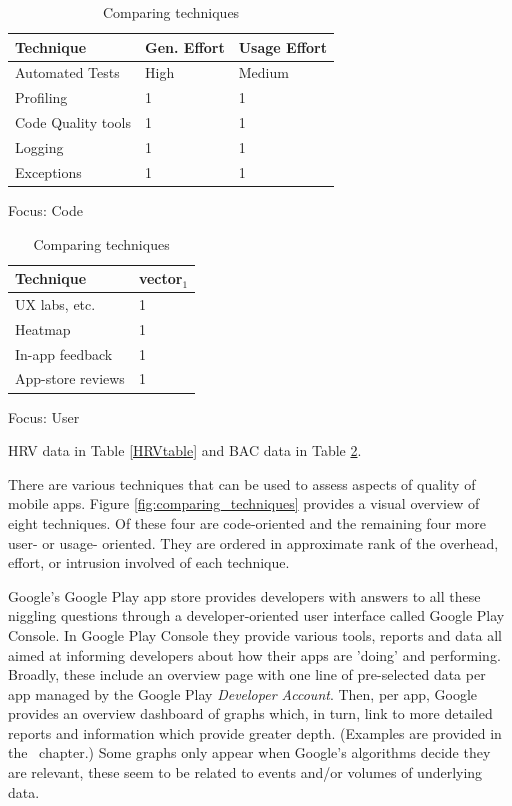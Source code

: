 \begin{table}[ht]
    \parbox{.40\linewidth}{
        \centering
        \small
        \begin{tabular}{lll}
            Technique  & Gen. Effort & Usage Effort  \\
            \hline
            Automated Tests  & High  & Medium \\ 
            Profiling   & 1 & 1 \\
            Code Quality tools & 1 & 1 \\
            Logging   & 1 & 1 \\ 
            Exceptions  & 1 & 1 \\ 

        \end{tabular}
        \caption{Focus: Code \label{HRVtable}}
    }
    \hfill
    \parbox{.40\linewidth}{
        \centering
        \small
        \begin{tabular}{ll}
            Technique & vector$_1$  \\
            \hline
            UX labs, etc. & 1  \\ 
            Heatmap & 1  \\ 
            In-app feedback & 1  \\ 
            App-store reviews & 1  \\
        \end{tabular}
        \caption{Focus: User \label{BACtable}}}
    \caption{Comparing techniques}
\end{table}

HRV data in Table \ref{HRVtable} and BAC data in Table \ref{BACtable}.

There are various techniques that can be used to assess aspects of quality of mobile apps. Figure \ref{fig:comparing_techniques} provides a visual overview of eight techniques. Of these four are code-oriented and the remaining four more user- or usage- oriented. They are ordered in approximate rank of the overhead, effort, or intrusion involved of each technique. %

Google's Google Play app store provides developers with answers to all these niggling questions through a developer-oriented user interface called Google Play Console. 
In Google Play Console they provide various tools, reports and data all aimed at informing developers about how their apps are 'doing' and performing. Broadly, these include an overview page with one line of pre-selected data per app managed by the Google Play \textit{Developer Account}. Then, per app, Google provides an overview dashboard of graphs which, in turn, link to more detailed reports and information which provide greater depth. (Examples are provided in the~\href{chapter-analytics-tools}{\emph{}} chapter.)  Some graphs only appear when Google's algorithms decide they are relevant, these seem to be related to events and/or volumes of underlying data.




